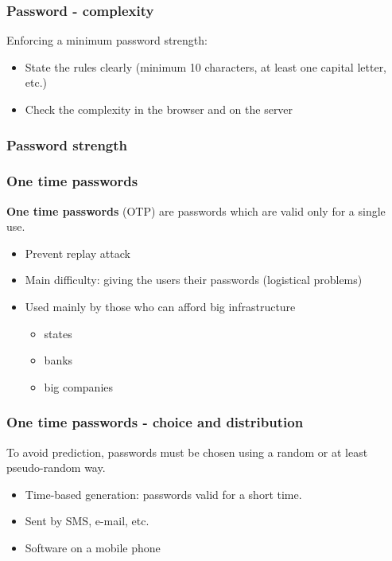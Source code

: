 \begin{frame}
\frametitle{Password - complexity}
Enforcing a minimum password strength:
\begin{itemize}
\item State the rules clearly (minimum 10 characters, at least one capital
letter, etc.)
\item Check the complexity in the browser and on the server
\end{itemize}
\end{frame}

\begin{frame}
\frametitle{Password strength}
\end{frame}

\begin{frame}
\frametitle{One time passwords}
\textbf{One time passwords} (OTP) are passwords which are valid only for a
single use.
\begin{itemize}
\item Prevent replay attack
\item Main difficulty: giving the users their passwords
	\small{(logistical problems)}
\item Used mainly by those who can afford big infrastructure
	\begin{itemize}
	\item states
	\item banks
	\item big companies
	\end{itemize}
\end{itemize}
\end{frame}

\begin{frame}
\frametitle{One time passwords - choice and distribution}
To avoid prediction, passwords must be chosen using a random or at
least pseudo-random way.
\begin{itemize}
\item Time-based generation: passwords valid for a short time.
\item Sent by SMS, e-mail, etc.
\item Software on a mobile phone
\end{itemize}
\end{frame}

